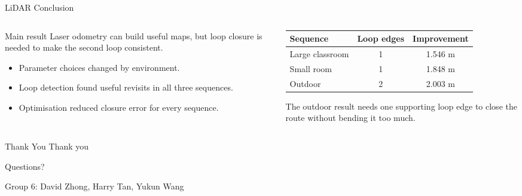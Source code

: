 \documentclass[aspectratio=169]{beamer}
\begin{document}
\begin{frame}{LiDAR Conclusion}
  \small
  \begin{columns}[T,onlytextwidth]
    \begin{column}{0.48\textwidth}
      \begin{block}{Main result}
        Laser odometry can build useful maps, but loop closure is needed to make the second loop consistent.
      \end{block}
      \vspace{0.2em}
      \begin{itemize}
        \item Parameter choices changed by environment.
        \item Loop detection found useful revisits in all three sequences.
        \item Optimisation reduced closure error for every sequence.
      \end{itemize}
    \end{column}
    \begin{column}{0.48\textwidth}
      \begin{table}
      \centering
      \scriptsize
      \begin{tabular}{lcc}
      \toprule
      Sequence & Loop edges & Improvement \\
      \midrule
      Large classroom & 1 & 1.546 m \\
      Small room & 1 & 1.848 m \\
      Outdoor & 2 & 2.003 m \\
      \bottomrule
      \end{tabular}
      \end{table}
      \vspace{0.1em}
      \scriptsize The outdoor result needs one supporting loop edge to close the route without bending it too much.
    \end{column}
  \end{columns}
\end{frame}

\begin{frame}{Thank You}
  \centering
  \vspace{1.5em}
  {\Huge Thank you}

  \vspace{1.2em}
  {\Large Questions?}

  \vspace{1.6em}
  {\small Group 6: David Zhong, Harry Tan, Yukun Wang}
\end{frame}
\end{document}
